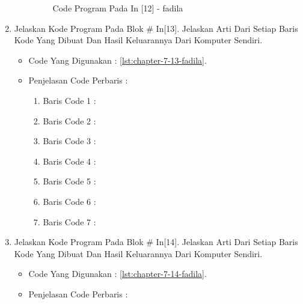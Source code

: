 \begin{enumerate}
\begin{itemize}
\begin{figure}[!hbtp]
\caption{Code Program Pada In [12] - fadila}
\label{chapter-7-in-12-fadila}
\end{figure}
\par
\par
\end{itemize}
\par
\par
\par
\item Jelaskan Kode Program Pada Blok \# In[13]. Jelaskan Arti Dari Setiap Baris Kode Yang Dibuat Dan Hasil Keluarannya Dari Komputer Sendiri.
\begin{itemize}
\item Code Yang Digunakan : \ref{lst:chapter-7-13-fadila}.

\par
\par
\item Penjelasan Code Perbaris	: 
\begin{enumerate}
\item Baris Code 1	:
\item Baris Code 2	:
\item Baris Code 3	:
\item Baris Code 4	:
\item Baris Code 5	:
\item Baris Code 6	:
\item Baris Code 7	:
\end{enumerate}
\par
\par
\par
\end{itemize}
\par
\par
\par
\item Jelaskan Kode Program Pada Blok \# In[14]. Jelaskan Arti Dari Setiap Baris Kode Yang Dibuat Dan Hasil Keluarannya Dari Komputer Sendiri.
\begin{itemize}
\item Code Yang Digunakan : \ref{lst:chapter-7-14-fadila}.

\par
\par
\item Penjelasan Code Perbaris	: 
\begin{enumerate}

\end{enumerate}
\end{itemize}
\end{enumerate}
